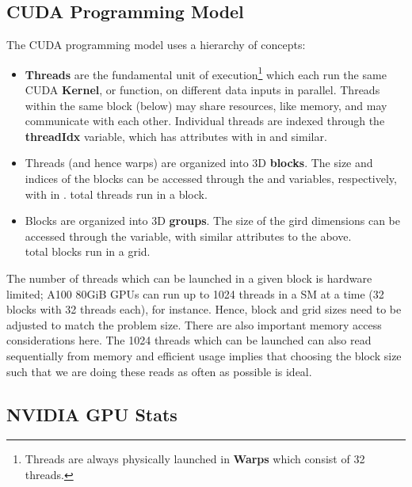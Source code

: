 \subsection{CUDA Programming Model}

The CUDA programming model uses a hierarchy of concepts:
\begin{itemize}
    \item \textbf{Threads}  are the fundamental unit of execution\footnote{Threads are always
        physically launched in \textbf{Warps} which consist of 32 threads.} which each run the same
        CUDA \textbf{Kernel}, or function, on different data inputs in parallel. Threads within the
        same block (below) may share resources, like memory, and may communicate with each other.
        Individual threads are indexed through the \textbf{threadIdx} variable, which has
         attributes with  in
         and similar.

	\item Threads (and hence warps) are organized into 3D \textbf{blocks}. The size and indices of
	      the blocks can be accessed through the  and 
	      variables, respectively, with  in .
	       total threads run in a block.
	\item Blocks are organized into 3D \textbf{groups}. The size of the gird dimensions can be
	      accessed through the  variable, with similar attributes to the above. \\
	       total blocks run in a grid.
\end{itemize}

The number of threads which can be launched in a given block is hardware limited; A100 80GiB GPUs
can run up to 1024 threads in a SM at a time (32 blocks with 32 threads each), for instance. Hence,
block and grid sizes need to be adjusted to match the problem size. There are also important memory
access considerations here. The 1024 threads which can be launched can also read sequentially from
memory and efficient usage implies that choosing the block size such that we are doing these reads
as often as possible is ideal.

\subsection{NVIDIA GPU Stats \label{app_gpu_stats}}


